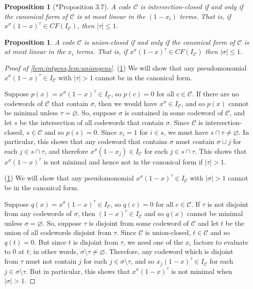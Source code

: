 \documentclass[11pt,letterpaper, reqno]{amsart}
\newtheorem{prop}[thm]{Proposition}  %
\theoremstyle{definition}
\def\cC{\mathcal{C}}
\begin{document}
    \begin{prop}[\cite{curto2019algebraic}*{Proposition 3.7}]\label{lem:intgens}
        A code $\cC$ is intersection-closed if and only if the canonical form of $\cC$ is at most linear in the $(1-x_i)$ terms. That is, if $x^\sigma(1-x)^\tau \in CF(I_\cC)$, then $|\tau| \leq 1$.
    \end{prop}
    \begin{prop}\label{lem:uniongens}
        A code $\cC$ is union-closed if and only if the canonical form of $\cC$ is at most linear in the $x_i$ terms. That is, if $x^\sigma(1-x)^\tau \in CF(I_\cC)$ then $|\sigma| \leq 1$.
    \end{prop}
    \begin{proof}[Proof of \cref{lem:intgens,lem:uniongens}]
		(\ref{lem:intgens}) We will show that any pseudomonomial $x^\sigma(1-x)^\tau \in I_\cC$ with $|\tau| > 1$ cannot be in the canonical form.
        
		Suppose $p(x) = x^\sigma (1-x)^\tau \in I_\cC$, so $p(c) = 0$ for all $c \in \cC$.
        If there are no codewords of $\cC$ that contain $\sigma$, then we would have $x^\sigma \in I_\cC$, and so $p(x)$ cannot be minimal unless $\tau = \varnothing$.
        So, suppose $\sigma$ is contained in some codeword of $\cC$, and let $s$ be the intersection of all codewords that contain $\sigma$.
        Since $\cC$ is intersection-closed, $s\in\cC$ and so $p(s) = 0$.
        Since $x_i = 1$ for $i \in s$, we must have $s \cap \tau \neq \varnothing$.
        In particular, this shows that any codeword that contains $\sigma$ must contain $\sigma \cup j$ for each $j \in s \cap \tau$, and therefore $x^\sigma(1-x_j) \in I_\cC$ for each $j \in s\cap \tau$.
        This shows that $x^\sigma(1-x)^\tau$ is not minimal and hence not in the canonical form if $|\tau| > 1$.
        
		(\ref{lem:uniongens}) We will show that any pseudomonomial $x^\sigma(1-x)^\tau \in I_\cC$ with $|\sigma| > 1$ cannot be in the canonical form.
		
		Suppose $q(x) = x^\sigma (1-x)^\tau \in I_\cC$, so $q(c) = 0$ for all $c \in \cC$.
        If $\tau$ is not disjoint from any codewords of $\sigma$, then $(1-x)^\tau \in I_\cC$ and so $q(x)$ cannot be minimal unless $\sigma = \varnothing$.
        So, suppose $\tau$ is disjoint from some codeword of $\cC$ and let $t$ be the union of all codewords disjoint from $\tau$.
        Since $\cC$ is union-closed, $t \in \cC$ and so $q(t) = 0$. But since $t$ is disjoint from $\tau$, we need one of the $x_i$ factors to evaluate to 0 at $t$; in other words, $\sigma \setminus \tau \neq \varnothing$.
        Therefore, any codeword which is disjoint from $\tau$ must not contain $j$ for each $j\in \sigma \setminus \tau$, and so $x_j(1-x)^\tau \in I_\cC$ for each $j \in \sigma\setminus \tau$.
        But in particular, this shows that $x^\sigma (1-x)^\tau$ is not minimal when $|\sigma| > 1$.
	\end{proof}
\end{document}

